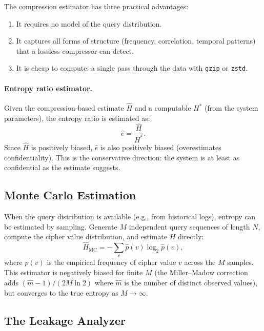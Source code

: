 \documentclass[conference]{IEEEtran}
\theoremstyle{definition}
\theoremstyle{plain}
\theoremstyle{remark}
\begin{document}
The compression estimator has three practical advantages:
\begin{enumerate}
\item It requires no model of the query distribution.
\item It captures all forms of structure (frequency, correlation,
  temporal patterns) that a lossless compressor can detect.
\item It is cheap to compute: a single pass through the data with
  \texttt{gzip} or \texttt{zstd}.
\end{enumerate}

\paragraph{Entropy ratio estimator.}
Given the compression-based estimate $\hat{H}$ and a computable
$H^*$ (from the system parameters), the entropy ratio is estimated as:
\begin{equation}
\hat{e} = \frac{\hat{H}}{H^*}.
\end{equation}
Since $\hat{H}$ is positively biased, $\hat{e}$ is also positively
biased (overestimates confidentiality).  This is the conservative
direction: the system is at least as confidential as the estimate suggests.

\subsection{Monte Carlo Estimation}

When the query distribution is available (e.g., from historical logs),
entropy can be estimated by sampling.  Generate $M$ independent query
sequences of length $N$, compute the cipher value distribution, and
estimate $H$ directly:
\begin{equation}
\hat{H}_{\mathrm{MC}} = -\sum_v \hat{p}(v) \log_2 \hat{p}(v),
\end{equation}
where $\hat{p}(v)$ is the empirical frequency of cipher value $v$ across
the $M$ samples.  This estimator is negatively biased for finite $M$
(the Miller--Madow correction adds $(\hat{m} - 1) / (2M \ln 2)$ where
$\hat{m}$ is the number of distinct observed values), but converges to
the true entropy as $M \to \infty$.

\subsection{The Leakage Analyzer}
\end{document}
